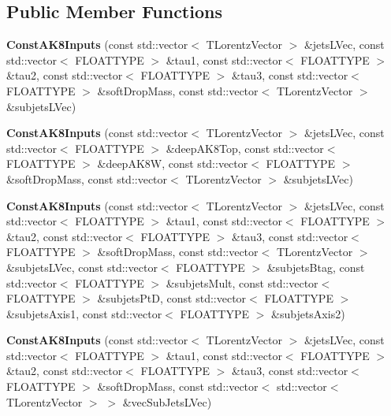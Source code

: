 \subsection*{Public Member Functions}
\begin{DoxyCompactItemize}
\item 
\hypertarget{classttUtility_1_1ConstAK8Inputs_aaae2a8597035f10337b5454e34af790c}{{\bfseries Const\-A\-K8\-Inputs} (const std\-::vector$<$ T\-Lorentz\-Vector $>$ \&jets\-L\-Vec, const std\-::vector$<$ F\-L\-O\-A\-T\-T\-Y\-P\-E $>$ \&tau1, const std\-::vector$<$ F\-L\-O\-A\-T\-T\-Y\-P\-E $>$ \&tau2, const std\-::vector$<$ F\-L\-O\-A\-T\-T\-Y\-P\-E $>$ \&tau3, const std\-::vector$<$ F\-L\-O\-A\-T\-T\-Y\-P\-E $>$ \&soft\-Drop\-Mass, const std\-::vector$<$ T\-Lorentz\-Vector $>$ \&subjets\-L\-Vec)}\label{classttUtility_1_1ConstAK8Inputs_aaae2a8597035f10337b5454e34af790c}

\item 
\hypertarget{classttUtility_1_1ConstAK8Inputs_a307cb95fbf4aa168baac6823dba63d04}{{\bfseries Const\-A\-K8\-Inputs} (const std\-::vector$<$ T\-Lorentz\-Vector $>$ \&jets\-L\-Vec, const std\-::vector$<$ F\-L\-O\-A\-T\-T\-Y\-P\-E $>$ \&deep\-A\-K8\-Top, const std\-::vector$<$ F\-L\-O\-A\-T\-T\-Y\-P\-E $>$ \&deep\-A\-K8\-W, const std\-::vector$<$ F\-L\-O\-A\-T\-T\-Y\-P\-E $>$ \&soft\-Drop\-Mass, const std\-::vector$<$ T\-Lorentz\-Vector $>$ \&subjets\-L\-Vec)}\label{classttUtility_1_1ConstAK8Inputs_a307cb95fbf4aa168baac6823dba63d04}

\item 
\hypertarget{classttUtility_1_1ConstAK8Inputs_a4f18f62b24822d170a0cebad8c70eb2b}{{\bfseries Const\-A\-K8\-Inputs} (const std\-::vector$<$ T\-Lorentz\-Vector $>$ \&jets\-L\-Vec, const std\-::vector$<$ F\-L\-O\-A\-T\-T\-Y\-P\-E $>$ \&tau1, const std\-::vector$<$ F\-L\-O\-A\-T\-T\-Y\-P\-E $>$ \&tau2, const std\-::vector$<$ F\-L\-O\-A\-T\-T\-Y\-P\-E $>$ \&tau3, const std\-::vector$<$ F\-L\-O\-A\-T\-T\-Y\-P\-E $>$ \&soft\-Drop\-Mass, const std\-::vector$<$ T\-Lorentz\-Vector $>$ \&subjets\-L\-Vec, const std\-::vector$<$ F\-L\-O\-A\-T\-T\-Y\-P\-E $>$ \&subjets\-Btag, const std\-::vector$<$ F\-L\-O\-A\-T\-T\-Y\-P\-E $>$ \&subjets\-Mult, const std\-::vector$<$ F\-L\-O\-A\-T\-T\-Y\-P\-E $>$ \&subjets\-Pt\-D, const std\-::vector$<$ F\-L\-O\-A\-T\-T\-Y\-P\-E $>$ \&subjets\-Axis1, const std\-::vector$<$ F\-L\-O\-A\-T\-T\-Y\-P\-E $>$ \&subjets\-Axis2)}\label{classttUtility_1_1ConstAK8Inputs_a4f18f62b24822d170a0cebad8c70eb2b}

\item 
\hypertarget{classttUtility_1_1ConstAK8Inputs_af9b5c0cf9a84a55923c86ff27ec8ce1d}{{\bfseries Const\-A\-K8\-Inputs} (const std\-::vector$<$ T\-Lorentz\-Vector $>$ \&jets\-L\-Vec, const std\-::vector$<$ F\-L\-O\-A\-T\-T\-Y\-P\-E $>$ \&tau1, const std\-::vector$<$ F\-L\-O\-A\-T\-T\-Y\-P\-E $>$ \&tau2, const std\-::vector$<$ F\-L\-O\-A\-T\-T\-Y\-P\-E $>$ \&tau3, const std\-::vector$<$ F\-L\-O\-A\-T\-T\-Y\-P\-E $>$ \&soft\-Drop\-Mass, const std\-::vector$<$ std\-::vector$<$ T\-Lorentz\-Vector $>$ $>$ \&vec\-Sub\-Jets\-L\-Vec)}\label{classttUtility_1_1ConstAK8Inputs_af9b5c0cf9a84a55923c86ff27ec8ce1d}


\end{DoxyCompactItemize}
